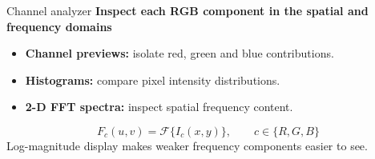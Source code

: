 \documentclass[aspectratio=169,11pt]{beamer}
\newcommand{\muted}[1]{{\color{Muted}#1}}
\begin{document}
\begin{frame}{Channel analyzer}
\textbf{Inspect each RGB component in the spatial and frequency domains}
\vspace{5mm}
\begin{itemize}\setlength\itemsep{4mm}
\item \textbf{Channel previews:} isolate red, green and blue contributions.
\item \textbf{Histograms:} compare pixel intensity distributions.
\item \textbf{2-D FFT spectra:} inspect spatial frequency content.
\end{itemize}
\vspace{4mm}
\[F_c(u,v)=\mathcal F\{I_c(x,y)\},\qquad c\in\{R,G,B\}\]
\vspace{2mm}
\muted{Log-magnitude display makes weaker frequency components easier to see.}
\end{frame}
\end{document}
